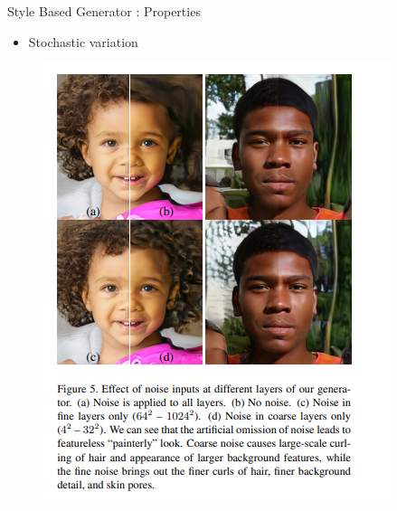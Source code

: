 \begin{frame}[fragile]{Style Based Generator : Properties }
        \begin{itemize}
        \item Stochastic variation
    \end{itemize}
    \begin{figure}[ht]
         \hspace*{-1cm}\includegraphics[width=0.7\linewidth]{stochasticvariation.png} \\ \\ \\ \\ \\
    \end{figure}

\end{frame}

